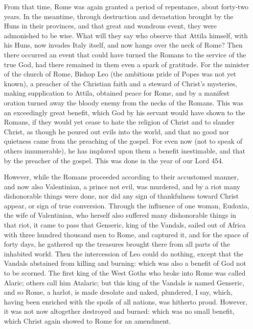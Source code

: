 From that time, Rome was again granted a period of repentance, about forty-two years. In the meantime, through destruction and devastation brought by the Huns in their provinces, and that great and wondrous event, they were admonished to be wise. What will they say who observe that Attila himself, with his Huns, now invades Italy itself, and now hangs over the neck of Rome? Then there occurred an event that could have turned the Romans to the service of the true God, had there remained in them even a spark of gratitude. For the minister of the church of Rome, Bishop Leo (the ambitious pride of Popes was not yet known), a preacher of the Christian faith and a steward of Christ's mysteries, making supplication to Attila, obtained peace for Rome, and by a manifest oration turned away the bloody enemy from the necks of the Romans. This was an exceedingly great benefit, which God by his servant would have shown to the Romans, if they would yet cease to hate the religion of Christ and to slander Christ, as though he poured out evils into the world, and that no good nor quietness came from the preaching of the gospel. For even now (not to speak of others innumerable), he has implored upon them a benefit inestimable, and that by the preacher of the gospel. This was done in the year of our Lord 454.

However, while the Romans proceeded according to their accustomed manner, and now also Valentinian, a prince not evil, was murdered, and by a riot many dishonorable things were done, nor did any sign of thankfulness toward Christ appear, or sign of true conversion. Through the influence of one woman, Eudoxia, the wife of Valentinian, who herself also suffered many dishonorable things in that riot, it came to pass that Genseric, king of the Vandals, sailed out of Africa with three hundred thousand men to Rome, and captured it, and for the space of forty days, he gathered up the treasures brought there from all parts of the inhabited world. Then the intercession of Leo could do nothing, except that the Vandals abstained from killing and burning: which was also a benefit of God not to be scorned. The first king of the West Goths who broke into Rome was called Alaric; others call him Atalaric; but this king of the Vandals is named Genseric, and so Rome, a harlot, is made desolate and naked, plundered, I say, which, having been enriched with the spoils of all nations, was hitherto proud. However, it was not now altogether destroyed and burned: which was no small benefit, which Christ again showed to Rome for an amendment.

